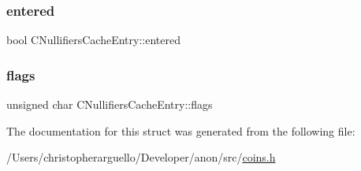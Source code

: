 \subsubsection{\texorpdfstring{entered}{entered}}
{\footnotesize\ttfamily bool C\+Nullifiers\+Cache\+Entry\+::entered}

\mbox{\label{struct_c_nullifiers_cache_entry_a16a0caf56cd410c811b0e4ac50e4feb9}} 
\subsubsection{\texorpdfstring{flags}{flags}}
{\footnotesize\ttfamily unsigned char C\+Nullifiers\+Cache\+Entry\+::flags}



The documentation for this struct was generated from the following file\+:\begin{DoxyCompactItemize}
\item 
/\+Users/christopherarguello/\+Developer/anon/src/\mbox{\hyperlink{coins_8h}{coins.\+h}}\end{DoxyCompactItemize}

